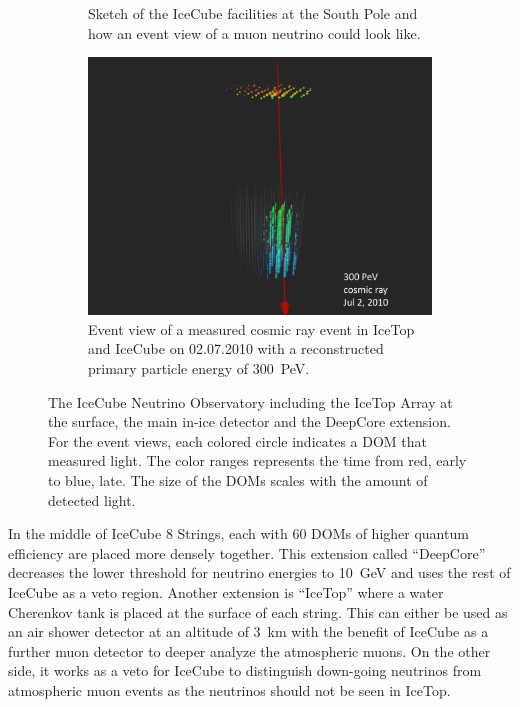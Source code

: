 \begin{figure}
\begin{subfigure}[t]{0.58\textwidth}
        \caption{Sketch of the IceCube facilities at the South Pole and how an event view of a muon neutrino could look like. \cite{IceCubePics}}
        \label{fig:icecube_detector}
    \end{subfigure}
    \hfill
    \begin{subfigure}[t]{0.38\textwidth}
        \centering
        \includegraphics[width=\textwidth]{./images/icecube_event_300_pev_2010_07_02.pdf}
        \caption{Event view of a measured cosmic ray event in IceTop and IceCube on 02.07.2010 with a reconstructed primary particle energy of \SI{300}{PeV}. \cite{IceCubePics}}
        \label{fig:icecube_event_view}
    \end{subfigure}
    \caption{The IceCube Neutrino Observatory including the IceTop Array at the surface, the main in-ice detector and the DeepCore extension. For the event views, each colored circle indicates a DOM that measured light. The color ranges represents the time from red, early to blue, late. The size of the DOMs scales with the amount of detected light.}
    \label{fig:icecube}
\end{figure}

In the middle of IceCube 8 Strings, each with 60 DOMs of higher quantum efficiency are placed more densely together.
This extension called \enquote{DeepCore} decreases the lower threshold for neutrino energies to \SI{10}{GeV} and uses the rest of IceCube as a veto region.
Another extension is \enquote{IceTop} where a water Cherenkov tank is placed at the surface of each string.
This can either be used as an air shower detector at an altitude of \SI{3}{km} with the benefit of IceCube as a further muon detector to deeper analyze the atmospheric muons.
On the other side, it works as a veto for IceCube to distinguish down-going neutrinos from atmospheric muon events as the neutrinos should not be seen in IceTop.

